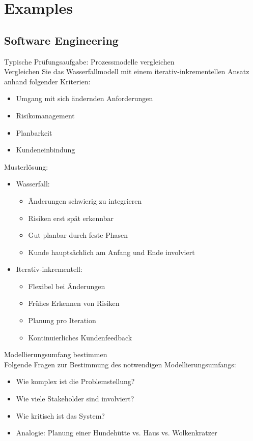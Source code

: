 \section{Examples}

\subsection{Software Engineering}

\begin{example2}{Typische Prüfungsaufgabe: Prozessmodelle vergleichen}\\
Vergleichen Sie das Wasserfallmodell mit einem iterativ-inkrementellen Ansatz anhand folgender Kriterien:
\begin{itemize}
    \item Umgang mit sich ändernden Anforderungen
    \item Risikomanagement
    \item Planbarkeit
    \item Kundeneinbindung
\end{itemize}

Musterlösung:
\begin{itemize}
    \item Wasserfall:
    \begin{itemize}
        \item Änderungen schwierig zu integrieren
        \item Risiken erst spät erkennbar
        \item Gut planbar durch feste Phasen
        \item Kunde hauptsächlich am Anfang und Ende involviert
    \end{itemize}
    \item Iterativ-inkrementell:
    \begin{itemize}
        \item Flexibel bei Änderungen
        \item Frühes Erkennen von Risiken
        \item Planung pro Iteration
        \item Kontinuierliches Kundenfeedback
    \end{itemize}
\end{itemize}
\end{example2}

\begin{KR}{Modellierungsumfang bestimmen}\\
Folgende Fragen zur Bestimmung des notwendigen Modellierungsumfangs:
\begin{itemize}
    \item Wie komplex ist die Problemstellung?
    \item Wie viele Stakeholder sind involviert?
    \item Wie kritisch ist das System?
    \item Analogie: Planung einer Hundehütte vs. Haus vs. Wolkenkratzer
\end{itemize}
\end{KR}

